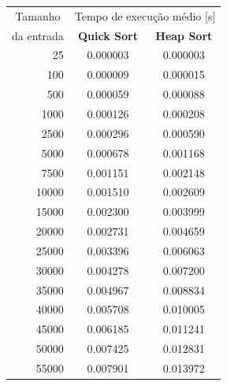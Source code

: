 \documentclass[fontsize=10pt]{article}
\begin{document}
\begin{table}[!htbp]
\centering
\begin{tabular}{@{}r|cc@{}}
\multicolumn{1}{c|}{Tamanho}    & \multicolumn{2}{c}{Tempo de execução médio {[}s{]}} \\
\multicolumn{1}{c|}{da entrada} & \textbf{Quick Sort}       & \textbf{Heap Sort}      \\ \midrule
25                              & 0.000003                  & 0.000003                \\
100                             & 0.000009                  & 0.000015                \\
500                             & 0.000059                  & 0.000088                \\
1000                            & 0.000126                  & 0.000208                \\
2500                            & 0.000296                  & 0.000590                \\
5000                            & 0.000678                  & 0.001168                \\
7500                            & 0.001151                  & 0.002148                \\
10000                           & 0.001510                  & 0.002609                \\
15000                           & 0.002300                  & 0.003999                \\
20000                           & 0.002731                  & 0.004659                \\
25000                           & 0.003396                  & 0.006063                \\
30000                           & 0.004278                  & 0.007200                \\
35000                           & 0.004967                  & 0.008834                \\
40000                           & 0.005708                  & 0.010005                \\
45000                           & 0.006185                  & 0.011241                \\
50000                           & 0.007425                  & 0.012831                \\
55000                           & 0.007901                  & 0.013972                \\

\end{tabular}
\end{table}
\end{document}
